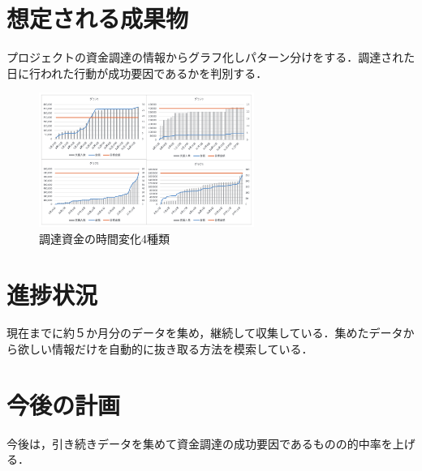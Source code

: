 \documentclass[uplatex,twocolumn,dvipdfmx]{jsarticle}
\begin{document}
\section{想定される成果物}
プロジェクトの資金調達の情報からグラフ化しパターン分けをする．調達された日に行われた行動が成功要因であるかを判別する．

\begin{figure}[h]
\includegraphics[width=7cm,clip]{images.pdf}
\caption{調達資金の時間変化4種類}\label{サンプル図}
\end{figure}
\section{進捗状況}
現在までに約５か月分のデータを集め，継続して収集している．集めたデータから欲しい情報だけを自動的に抜き取る方法を模索している．
\section{今後の計画}
今後は，引き続きデータを集めて資金調達の成功要因であるものの的中率を上げる．



\end{document}
